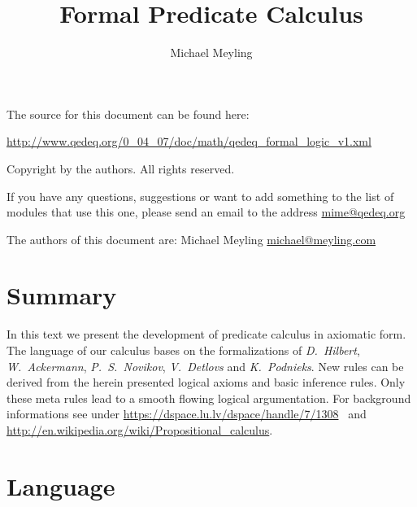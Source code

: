 \documentclass[a4paper,german,10pt,twoside]{book}
\title{Formal Predicate Calculus}
\author{
Michael Meyling
}
\theoremstyle{definition}
\theoremstyle{remark}
\begin{document}
\maketitle

\setlength{\parskip}{5pt plus 2pt minus 1pt}
\mbox{}
\vfill

\par
The source for this document can be found here:
\par
\url{http://www.qedeq.org/0_04_07/doc/math/qedeq_formal_logic_v1.xml}

\par
Copyright by the authors. All rights reserved.
\par
If you have any questions, suggestions or want to add something to the list of modules that use this one, please send an email to the address \href{mailto:mime@qedeq.org}{mime@qedeq.org}

\par
The authors of this document are:
Michael Meyling \href{mailto:michael@meyling.com}{michael@meyling.com}



\setlength{\parskip}{0pt}
\tableofcontents

\setlength{\parskip}{5pt plus 2pt minus 1pt}

\chapter*{Summary} \label{chapter1} \hypertarget{chapter1}{}

In this text we present the development of predicate calculus in axiomatic form.
The language of our calculus bases on the formalizations of \emph{D.~Hilbert}, \emph{W.~Ackermann}\cite{hilback}, \emph{P.~S.~Novikov}\cite{novikov}, \emph{V.~Detlovs} and \emph{K.~Podnieks}\cite{detnieks}. New rules can be derived from the herein presented logical axioms and basic inference rules. Only these meta rules lead to a smooth flowing logical argumentation.
For background informations see under \url{https://dspace.lu.lv/dspace/handle/7/1308}~\cite{detnieks}
and \url{http://en.wikipedia.org/wiki/Propositional_calculus}.


\chapter{Language} \label{chapter2} \hypertarget{chapter2}{}
\end{document}
